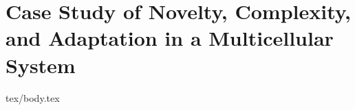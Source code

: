 \chapter{Case Study of Novelty, Complexity, and Adaptation in a Multicellular System}
\label{ch:measuring-cna}

{tex/body.tex}
